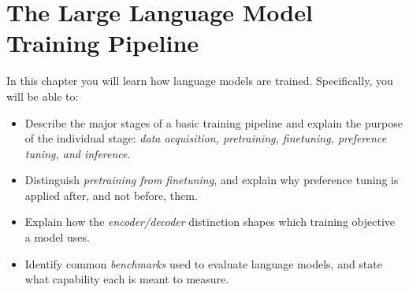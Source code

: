 
\chapter[LLM Training Pipeline]{The Large Language Model Training Pipeline}\label{chap:pipeline}


\begin{learningbox}
In this chapter you will learn how language models are trained. Specifically, you will be able to:
\begin{itemize}[leftmargin=*, nosep]
    \item Describe the major stages of a basic  training pipeline and explain the purpose of the individual stage: {\em data acquisition, pretraining, finetuning, preference tuning, and inference}.
    \item Distinguish {\em pretraining from finetuning}, and explain why preference tuning is applied after, and not before, them.
    \item Explain how the {\em encoder/decoder} distinction shapes which training objective a model uses.
    \item Identify common {\em benchmarks} used to evaluate language models, and state what capability each is meant to measure.
\end{itemize}
\end{learningbox}


